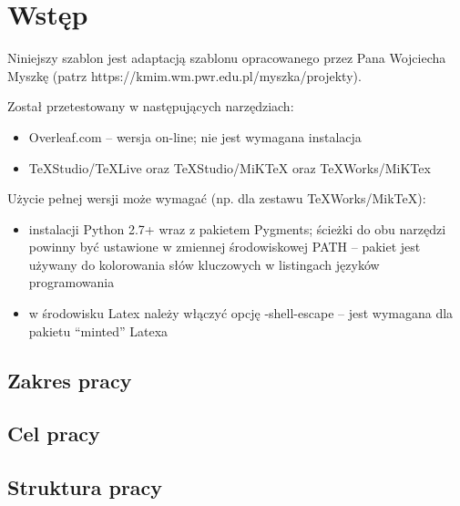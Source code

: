 
\chapter*{Wstęp}\label{chapter:introduction}

Niniejszy szablon jest \cite{ai_town_ref} adaptacją szablonu opracowanego przez Pana Wojciecha Myszkę (patrz https://kmim.wm.pwr.edu.pl/myszka/projekty).

Został przetestowany w następujących narzędziach:
\begin{itemize}
    \item Overleaf.com -- wersja on-line; nie jest wymagana instalacja
    \item TeXStudio/TeXLive oraz TeXStudio/MiKTeX oraz TeXWorks/MiKTex
\end{itemize}

Użycie pełnej wersji może wymagać (np. dla zestawu TeXWorks/MikTeX):
\begin{itemize}
    \item instalacji Python 2.7+ wraz z pakietem Pygments; ścieżki do obu narzędzi powinny być ustawione w zmiennej środowiskowej PATH -- pakiet jest używany do kolorowania słów kluczowych w listingach języków programowania
    \item w środowisku Latex należy włączyć opcję -shell-escape  -- jest wymagana dla pakietu ``minted'' Latexa
\end{itemize}

\section*{Zakres pracy}

\lipsum[5]

\section*{Cel pracy}

\lipsum[6]

\section*{Struktura pracy}

\lipsum[7]